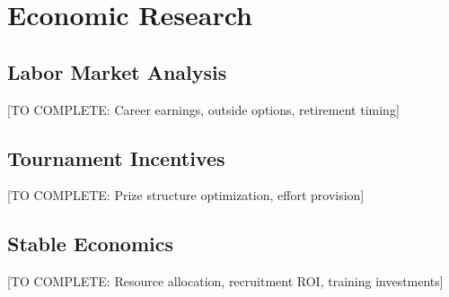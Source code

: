 \section{Economic Research}

\subsection{Labor Market Analysis}

[TO COMPLETE: Career earnings, outside options, retirement timing]

\subsection{Tournament Incentives}

[TO COMPLETE: Prize structure optimization, effort provision]

\subsection{Stable Economics}

[TO COMPLETE: Resource allocation, recruitment ROI, training investments]